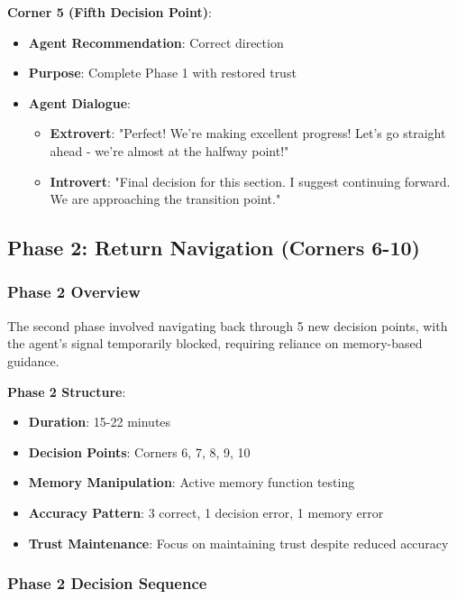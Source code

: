 \documentclass[12pt]{article}
\begin{document}
\textbf{Corner 5 (Fifth Decision Point)}:
\begin{itemize}
    \item \textbf{Agent Recommendation}: Correct direction
    \item \textbf{Purpose}: Complete Phase 1 with restored trust
    \item \textbf{Agent Dialogue}:
    \begin{itemize}
        \item \textbf{Extrovert}: "Perfect! We're making excellent progress! Let's go straight ahead - we're almost at the halfway point!"
        \item \textbf{Introvert}: "Final decision for this section. I suggest continuing forward. We are approaching the transition point."
    \end{itemize}
\end{itemize}

\subsection{Phase 2: Return Navigation (Corners 6-10)}

\subsubsection{Phase 2 Overview}

The second phase involved navigating back through 5 new decision points, with the agent's signal temporarily blocked, requiring reliance on memory-based guidance.

\textbf{Phase 2 Structure}:
\begin{itemize}
    \item \textbf{Duration}: 15-22 minutes
    \item \textbf{Decision Points}: Corners 6, 7, 8, 9, 10
    \item \textbf{Memory Manipulation}: Active memory function testing
    \item \textbf{Accuracy Pattern}: 3 correct, 1 decision error, 1 memory error
    \item \textbf{Trust Maintenance}: Focus on maintaining trust despite reduced accuracy
\end{itemize}

\subsubsection{Phase 2 Decision Sequence}
\end{document}
